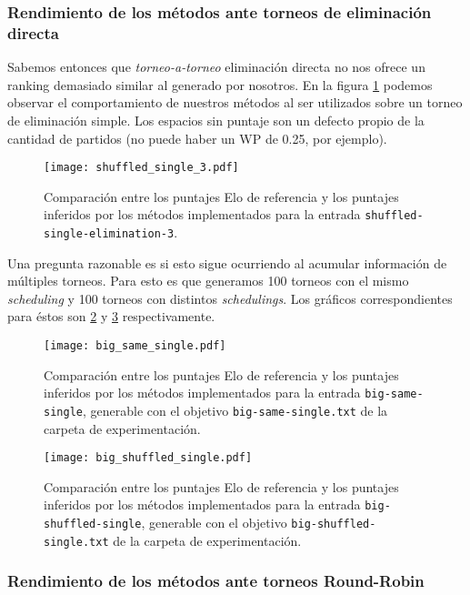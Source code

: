 \documentclass[a4paper]{article}
\begin{document}
\subsubsection{Rendimiento de los métodos ante torneos de eliminación directa}

Sabemos entonces que \textit{torneo-a-torneo} eliminación directa no nos ofrece un ranking demasiado similar al generado por nosotros. En la figura \ref{fig:shuffledsingle3} podemos observar el comportamiento de nuestros métodos al ser utilizados sobre un torneo de eliminación simple. Los espacios sin puntaje son un defecto propio de la cantidad de partidos (no puede haber un WP de 0.25, por ejemplo).
\begin{figure}
    \centering
    \texttt{[image: shuffled\_single\_3.pdf]}
    \caption{Comparación entre los puntajes Elo de referencia y los puntajes inferidos por los métodos implementados para la entrada \texttt{shuffled-single-elimination-3}.}
    \label{fig:shuffledsingle3}
\end{figure}

Una pregunta razonable es si esto sigue ocurriendo al acumular información de múltiples torneos. Para esto es que generamos 100 torneos con el mismo \textit{scheduling} y 100 torneos con distintos \textit{schedulings}. Los gráficos correspondientes para éstos son \ref{fig:directamismoschedule} y \ref{fig:directadistintoschedule} respectivamente.
\begin{figure}
    \centering
    \texttt{[image: big\_same\_single.pdf]}
    \caption{Comparación entre los puntajes Elo de referencia y los puntajes inferidos por los métodos implementados para la entrada \texttt{big-same-single}, generable con el objetivo \texttt{big-same-single.txt} de la carpeta de experimentación.}
    \label{fig:directamismoschedule}
\end{figure}
\begin{figure}
    \centering
    \texttt{[image: big\_shuffled\_single.pdf]}
    \caption{Comparación entre los puntajes Elo de referencia y los puntajes inferidos por los métodos implementados para la entrada \texttt{big-shuffled-single}, generable con el objetivo \texttt{big-shuffled-single.txt} de la carpeta de experimentación.}
    \label{fig:directadistintoschedule}
\end{figure}

\subsubsection{Rendimiento de los métodos ante torneos Round-Robin}
\end{document}
